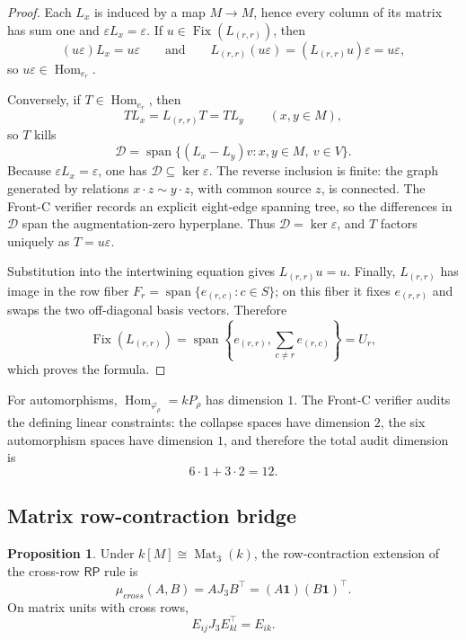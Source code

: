 \documentclass[11pt]{article}
\theoremstyle{definition}
\newtheorem{proposition}[theorem]{Proposition}
\newcommand{\RP}{\mathsf{RP}}
\begin{document}
\begin{proof}
Each \(L_x\) is induced by a map \(M\to M\), hence every column of its
matrix has sum one and \(\varepsilon L_x=\varepsilon\).  If
\(u\in\operatorname{Fix}(L_{(r,r)})\), then
\[
(u\varepsilon)L_x=u\varepsilon
\qquad\text{and}\qquad
L_{(r,r)}(u\varepsilon)=(L_{(r,r)}u)\varepsilon=u\varepsilon,
\]
so \(u\varepsilon\in\operatorname{Hom}_{e_r}\).

Conversely, if \(T\in\operatorname{Hom}_{e_r}\), then
\[
T L_x=L_{(r,r)}T=T L_y
\qquad(x,y\in M),
\]
so \(T\) kills
\[
\mathcal D=\operatorname{span}\{(L_x-L_y)v:x,y\in M,\ v\in V\}.
\]
Because \(\varepsilon L_x=\varepsilon\), one has
\(\mathcal D\subseteq\ker\varepsilon\).  The reverse inclusion is finite:
the graph generated by relations \(x\cdot z\sim y\cdot z\), with common
source \(z\), is connected.  The Front-C verifier records an explicit
eight-edge spanning tree, so the differences in \(\mathcal D\) span the
augmentation-zero hyperplane.  Thus \(\mathcal D=\ker\varepsilon\), and
\(T\) factors uniquely as \(T=u\varepsilon\).

Substitution into the intertwining equation gives
\(L_{(r,r)}u=u\).  Finally, \(L_{(r,r)}\) has image in the row fiber
\(F_r=\operatorname{span}\{e_{(r,c)}:c\in S\}\); on this fiber it fixes
\(e_{(r,r)}\) and swaps the two off-diagonal basis vectors.  Therefore
\[
\operatorname{Fix}(L_{(r,r)})
=
\operatorname{span}\left\{e_{(r,r)},\sum_{c\ne r}e_{(r,c)}\right\}=U_r,
\]
which proves the formula.
\end{proof}

For automorphisms, \(\operatorname{Hom}_{\varphi_\rho}=kP_\rho\) has
dimension \(1\).  The Front-C verifier audits the defining linear
constraints: the collapse spaces have dimension \(2\), the six
automorphism spaces have dimension \(1\), and therefore the total audit
dimension is
\[
6\cdot1+3\cdot2=12.
\]

\subsection{Matrix row-contraction bridge}\label{cross-row-row-contraction}

\begin{proposition}
\label{prop:16.3}
Under \(k[M]\cong\operatorname{Mat}_3(k)\), the row-contraction extension
of the cross-row \(\RP\) rule is
\[
\mu_{cross}(A,B)=AJ_3B^\top=(A\mathbf1)(B\mathbf1)^\top.
\]
On matrix units with cross rows,
\[
E_{ij}J_3E_{kl}^\top=E_{ik}.
\]
\end{proposition}
\end{document}
